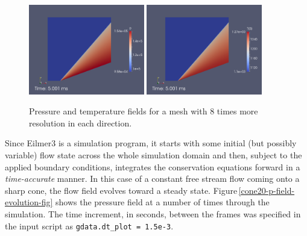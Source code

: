 \begin{figure}[htbp]
\begin{center}
\includegraphics[width=0.45\textwidth]{../2D/cone20-simple/cone20_p_factor-8-grid-res.png}
\includegraphics[width=0.45\textwidth]{../2D/cone20-simple/cone20_T0_factor-8-grid-res.png}
\end{center}
\caption{Pressure and temperature fields for a mesh with 8 times more resolution in each direction.}
\label{cone20-high-res-fig}
\end{figure}

\medskip
Since Eilmer3 is a simulation program, it starts with some initial (but possibly variable) 
flow state across the whole simulation domain and then, subject to the applied boundary conditions,
integrates the conservation equations forward in a \textit{time-accurate} manner.
In this case of a constant free stream flow coming onto a sharp cone, the flow field evolves toward 
a steady state.
Figure\,\ref{cone20-p-field-evolution-fig} shows the pressure field at a number of times
through the simulation.
The time increment, in seconds, between the frames was specified 
in the input script as \verb!gdata.dt_plot = 1.5e-3!.

